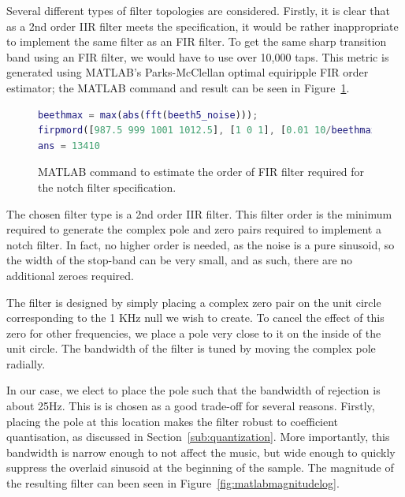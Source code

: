\documentclass[]{article}
\begin{document}
Several different types of filter topologies are considered. Firstly, it is clear that as a 2nd order IIR filter meets the specification, it would be rather inappropriate to implement the same filter as an FIR filter. To get the same sharp transition band using an FIR filter, we would have to use over 10,000 taps. This metric is generated using MATLAB's Parks-McClellan optimal equiripple FIR order estimator; the MATLAB command and result can be seen in Figure~\ref{fig:firpmord}.

\begin{figure}[htbp]
	\begin{center}
		\begin{lstlisting}[language = Matlab]
beethmax = max(abs(fft(beeth5_noise)));
firpmord([987.5 999 1001 1012.5], [1 0 1], [0.01 10/beethmax 0.01], 44100)
ans = 13410
		\end{lstlisting}
	\end{center}
	\caption{MATLAB command to estimate the order of FIR filter required for the notch filter specification.}
	\label{fig:firpmord}
\end{figure}

The chosen filter type is a 2nd order IIR filter. This filter order is the minimum required to generate the complex pole and zero pairs required to implement a notch filter. In fact, no higher order is needed, as the noise is a pure sinusoid, so the width of the stop-band can be very small, and as such, there are no additional zeroes required.

The filter is designed by simply placing a complex zero pair on the unit circle corresponding to the 1 KHz null we wish to create. To cancel the effect of this zero for other frequencies, we place a pole very close to it on the inside of the unit circle. The bandwidth of the filter is tuned by moving the complex pole radially.

In our case, we elect to place the pole such that the bandwidth of rejection is about 25Hz. This is is chosen as a good trade-off for several reasons. Firstly, placing the pole at this location makes the filter robust to coefficient quantisation, as discussed in Section~\ref{sub:quantization}.
More importantly, this bandwidth is narrow enough to not affect the music, but wide enough to quickly suppress the overlaid sinusoid at the beginning of the sample.
The magnitude of the resulting filter can been seen in Figure~\ref{fig:matlabmagnitudelog}.

\end{document}
